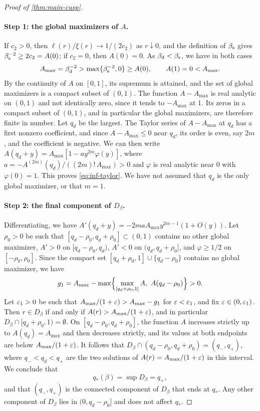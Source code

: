 \begin{proof}[Proof of \cref{thm:main-cusp}]
\paragraph{Step 1: the global maximizers of $A$.} If $c_2>0$, then $\ell(r)/\xi(r)\to1/(2c_2)$ as $r\downarrow0$, and the definition of $\beta_{\mathrm s}$ gives $\beta_{\mathrm s}^{-2}\ge2c_2=A(0)$; if $c_2=0$, then $A(0)=0$. As $\beta_{\mathrm d}<\beta_{\mathrm s}$, we have in both cases
\begin{equation*}
A_{\max}=\beta_{\mathrm d}^{-2}>\max\{\beta_{\mathrm s}^{-2},0\}\ge A(0),\qquad A(1)=0<A_{\max}.
\end{equation*}
By the continuity of $A$ on $[0,1]$, its supremum is attained, and the set of global maximizers is a compact subset of $(0,1)$. The function $A-A_{\max}$ is real analytic on $(0,1)$ and not identically zero, since it tends to $-A_{\max}$ at $1$. Its zeros in a compact subset of $(0,1)$, and in particular the global maximizers, are therefore finite in number. Let $q_d$ be the largest. The Taylor series of $A-A_{\max}$ at $q_d$ has a first nonzero coefficient, and since $A-A_{\max}\le0$ near $q_d$, its order is even, say $2m$, and the coefficient is negative. We can then write $A(q_d+y)=A_{\max}[1-ay^{2m}\varphi(y)]$, where $a=-A^{(2m)}(q_d)/((2m)!\,A_{\max})>0$ and $\varphi$ is real analytic near $0$ with $\varphi(0)=1$. This proves \eqref{eq:inf-taylor}. We have not assumed that $q_d$ is the only global maximizer, or that $m=1$.

\paragraph{Step 2: the final component of $D_\beta$.} Differentiating, we have $A'(q_d+y)=-2maA_{\max}y^{2m-1}(1+O(y))$. Let $\rho_0>0$ be such that $[q_d-\rho_0,q_d+\rho_0]\subset(0,1)$ contains no other global maximizer, $A'>0$ on $[q_d-\rho_0,q_d)$, $A'<0$ on $(q_d,q_d+\rho_0]$, and $\varphi\ge1/2$ on $[-\rho_0,\rho_0]$. Since the compact set $[q_d+\rho_0,1]\cup\{q_d-\rho_0\}$ contains no global maximizer, we have
\begin{equation*}
g_1=A_{\max}-\max\Bigl\{\max_{[q_d+\rho_0,1]}A,\ A(q_d-\rho_0)\Bigr\}>0.
\end{equation*}
Let $\varepsilon_1>0$ be such that $A_{\max}/(1+\varepsilon)>A_{\max}-g_1$ for $\varepsilon<\varepsilon_1$, and fix $\varepsilon\in(0,\varepsilon_1)$. Then $r\in D_\beta$ if and only if $A(r)>A_{\max}/(1+\varepsilon)$, and in particular $D_\beta\cap[q_d+\rho_0,1)=\emptyset$. On $[q_d-\rho_0,q_d+\rho_0]$, the function $A$ increases strictly up to $A(q_d)=A_{\max}$ and then decreases strictly, and its values at both endpoints are below $A_{\max}/(1+\varepsilon)$. It follows that $D_\beta\cap(q_d-\rho_0,q_d+\rho_0)=(q_-,q_+)$, where $q_-<q_d<q_+$ are the two solutions of $A(r)=A_{\max}/(1+\varepsilon)$ in this interval. We conclude that
\begin{equation*}
q_*(\beta)=\sup D_\beta=q_+,
\end{equation*}
and that $(q_-,q_+)$ is the connected component of $D_\beta$ that ends at $q_*$. Any other component of $D_\beta$ lies in $(0,q_d-\rho_0]$ and does not affect $q_*$.


\end{proof}

